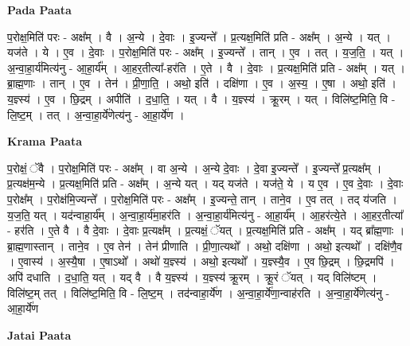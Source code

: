 \documentclass[17pt]{extarticle}
\begin{document}
\textbf{Pada Paata} \newline

प॒रोक्ष॒मिति॑ परः - अक्ष᳚म् । वै । अ॒न्ये । दे॒वाः । इ॒ज्यन्ते᳚ । प्र॒त्यक्ष॒मिति॑ प्रति - अक्ष᳚म् । अ॒न्ये । यत् । यज॑ते । ये । ए॒व । दे॒वाः । प॒रोक्ष॒मिति॑ परः - अक्ष᳚म् । इ॒ज्यन्ते᳚ । तान् । ए॒व । तत् । य॒ज॒ति॒ । यत् । अ॒न्वा॒हा॒र्य॑मित्य॑नु - आ॒हा॒र्य᳚म् । आ॒हर॒तीत्या᳚-हर॑ति । ए॒ते । वै । दे॒वाः । प्र॒त्यक्ष॒मिति॑ प्रति - अक्ष᳚म् । यत् । ब्रा॒ह्म॒णाः । तान् । ए॒व । तेन॑ । प्री॒णा॒ति॒ । अथो॒ इति॑ । दक्षि॑णा । ए॒व । अ॒स्य॒ । ए॒षा । अथो॒ इति॑ । य॒ज्ञ्स्य॑ । ए॒व । छि॒द्रम् । अपीति॑ । द॒धा॒ति॒ । यत् । वै । य॒ज्ञ्स्य॑ । क्रू॒रम् । यत् । विलि॑ष्ट॒मिति॒ वि - लि॒ष्ट॒म् । तत् । अ॒न्वा॒हा॒र्ये॑णेत्य॑नु - आ॒हा॒र्ये॑ण ।  \newline


\textbf{Krama Paata} \newline

प॒रोक्षं॒ ॅवै । प॒रोक्ष॒मिति॑ परः - अक्ष᳚म् । वा अ॒न्ये । अ॒न्ये दे॒वाः । दे॒वा इ॒ज्यन्ते᳚ । इ॒ज्यन्ते᳚ प्र॒त्यक्ष᳚म् । प्र॒त्यक्ष॑म॒न्ये । प्र॒त्यक्ष॒मिति॑ प्रति - अक्ष᳚म् । अ॒न्ये यत् । यद् यज॑ते । यज॑ते॒ ये । 
य ए॒व । ए॒व दे॒वाः । दे॒वाः प॒रोक्ष᳚म् । प॒रोक्ष॑मि॒ज्यन्ते᳚ । प॒रोक्ष॒मिति॑ परः - अक्ष᳚म् । इ॒ज्यन्ते॒ तान् । ताने॒व । ए॒व तत् । तद् य॑जति । य॒ज॒ति॒ यत् । यद॑न्वाहा॒र्य᳚म् । अ॒न्वा॒हा॒र्य॑मा॒हर॑ति । अ॒न्वा॒हा॒र्य॑मित्य॑नु - आ॒हा॒र्य᳚म् । आ॒हर॑त्ये॒ते । आ॒हर॒तीत्या᳚ - हर॑ति । ए॒ते वै । वै दे॒वाः । दे॒वाः प्र॒त्यक्ष᳚म् । प्र॒त्यक्षं॒ ॅयत् । प्र॒त्यक्ष॒मिति॑ प्रति - अक्ष᳚म् । यद् ब्रा᳚ह्म॒णाः । ब्रा॒ह्म॒णास्तान् । ताने॒व । ए॒व तेन॑ । तेन॑ प्रीणाति । प्री॒णा॒त्यथो᳚ । अथो॒ दक्षि॑णा । अथो॒ इत्यथो᳚ । दक्षि॑णै॒व । ए॒वास्य॑ । अ॒स्यै॒षा । ए॒षाऽथो᳚ । अथो॑ य॒ज्ञ्स्य॑ । अथो॒ इत्यथो᳚ । य॒ज्ञ्स्यै॒व । ए॒व छि॒द्रम् । छि॒द्रमपि॑ । अपि॑ दधाति । द॒धा॒ति॒ यत् । यद् वै । वै य॒ज्ञ्स्य॑ । य॒ज्ञ्स्य॑ क्रू॒रम् । क्रू॒रं ॅयत् । यद् विलि॑ष्टम् । विलि॑ष्ट॒म् तत् । विलि॑ष्ट॒मिति॒ वि - लि॒ष्ट॒म् । तद॑न्वाहा॒र्ये॑ण । अ॒न्वा॒हा॒र्ये॑णा॒न्वाह॑रति । अ॒न्वा॒हा॒र्ये॑णेत्य॑नु - आ॒हा॒र्ये॑ण \newline

\textbf{Jatai Paata} \newline
\end{document}
